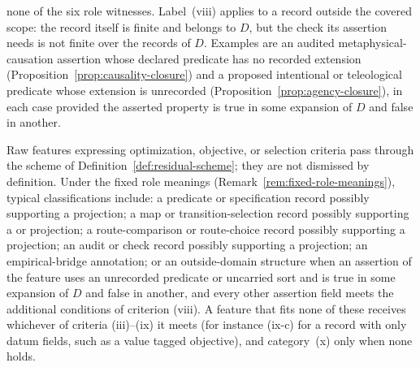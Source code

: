 none of the six role witnesses. Label~(viii) applies to a record outside the
covered scope: the record itself is finite and belongs to \(D\), but the check
its assertion needs is not finite over the records of \(D\). Examples are an audited metaphysical-causation assertion whose declared
predicate has no recorded extension (Proposition~\ref{prop:causality-closure})
and a proposed intentional or teleological predicate whose extension is
unrecorded (Proposition~\ref{prop:agency-closure}), in each case
provided the asserted property is true in some expansion of \(D\)
and false in another.

\begin{remark}\label{rem:optimization-not-excluded}
Raw features expressing optimization, objective, or selection criteria
pass through the scheme of Definition~\ref{def:residual-scheme}; they
are not dismissed by definition. Under the fixed role meanings
(Remark~\ref{rem:fixed-role-meanings}), typical classifications
include: a predicate or specification record possibly supporting a
\Ptwo{} projection; a map or transition-selection record possibly
supporting a \Pone{} or \Pfour{} projection; a route-comparison or
route-choice record possibly supporting a \Pthree{} projection; an
audit or check record possibly supporting a \Psix{} projection; an
empirical-bridge annotation; or an outside-domain structure when an assertion of the
feature uses an unrecorded predicate or uncarried sort and is true in some expansion of \(D\) and false in another, and every other assertion field meets the additional conditions of criterion (viii). A feature that
fits none of these receives whichever of criteria (iii)--(ix) it meets (for
instance (ix-c) for a record with only datum fields, such as a value tagged
objective), and category~(x) only when none holds.
\end{remark}

